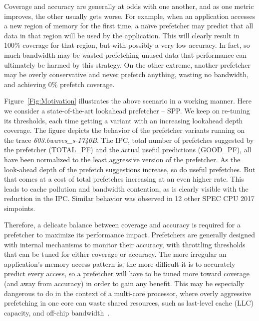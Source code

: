 Coverage and accuracy are generally at odds with one another, and as one metric improves, the other
usually gets worse.  For example, when an application accesses a new region of memory for the first
time, a na\"ive prefetcher may predict that all data in that region will be used by the application.
This will clearly result in 100\% coverage for that region, but with possibly a very low accuracy.
In fact, so much bandwidth may be wasted prefetching unused data that performance can ultimately be
harmed by this strategy.  On the other extreme, another prefetcher may be overly
conservative and never prefetch anything, wasting no bandwidth, and achieving 0\% prefetch
coverage.

Figure~\ref{Fig:Motivation} illustrates the above scenario in a working manner.
Here we consider a state-of-the-art lookahead prefetcher -- SPP. We keep on 
re-tuning its thresholds, each time getting a variant with an increasing lookahead 
depth coverage. The figure depicts the behavior of the prefetcher variants running 
on the trace \textit{603.bwaves\_s-1740B}. The IPC, total number of prefetches 
suggested by the prefetcher (TOTAL\_PF) and the actual useful predictions (GOOD\_PF),
all have been normalized to the least aggressive version of the prefetcher. 
As the look-ahead depth of the prefetch suggestions increase, so do useful prefetches. 
But that comes at a cost of total prefetches increasing at an even higher rate. This leads 
to cache pollution and bandwidth contention, as is clearly visible with the reduction in 
the IPC. Similar behavior was observed in 12 other SPEC CPU 2017 simpoints. 

Therefore, a delicate balance between coverage and accuracy is required for a prefetcher to maximize
its performance impact.  Prefetchers are generally designed with internal mechanisms to
monitor their accuracy, with throttling thresholds that can be tuned for either coverage 
or accuracy.  The more irregular an application's memory access pattern is, the more difficult
it is to accurately predict every access, so a prefetcher will have to be tuned more toward
coverage (and away from accuracy) in order to gain any benefit.  This may be especially dangerous
to do in the context of a multi-core processor, where overly aggressive prefetching in one core can
waste shared resources, such as last-level cache (LLC) capacity, and off-chip bandwidth~\cite{Friendly}.

